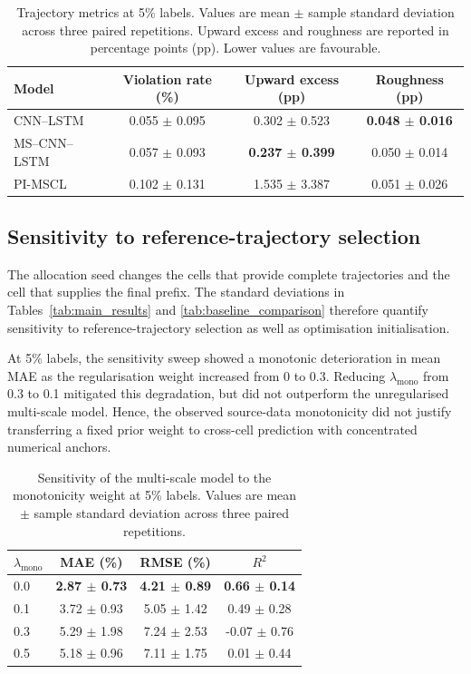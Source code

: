 \documentclass[pdflatex,sn-mathphys-num]{sn-jnl}
\begin{document}
\begin{table}[t]
\caption{Trajectory metrics at 5\% labels. Values are mean $\pm$ sample standard deviation across three paired repetitions. Upward excess and roughness are reported in percentage points (pp). Lower values are favourable.}
\label{tab:trajectory_metrics}
\centering
\small
\begin{tabular*}{\textwidth}{@{\extracolsep{\fill}}lccc@{}}
\toprule
Model & Violation rate (\%) & Upward excess (pp) & Roughness (pp) \\
\midrule
CNN--LSTM & 0.055 $\pm$ 0.095 & 0.302 $\pm$ 0.523 & \textbf{0.048 $\pm$ 0.016} \\
MS--CNN--LSTM & 0.057 $\pm$ 0.093 & \textbf{0.237 $\pm$ 0.399} & 0.050 $\pm$ 0.014 \\
PI-MSCL & 0.102 $\pm$ 0.131 & 1.535 $\pm$ 3.387 & 0.051 $\pm$ 0.026 \\
\bottomrule
\end{tabular*}
\end{table}

\subsection{Sensitivity to reference-trajectory selection}
\label{subsec:sensitivity}

The allocation seed changes the cells that provide complete trajectories and the cell that supplies the final prefix. The standard deviations in Tables~\ref{tab:main_results} and \ref{tab:baseline_comparison} therefore quantify sensitivity to reference-trajectory selection as well as optimisation initialisation.

At 5\% labels, the sensitivity sweep showed a monotonic deterioration in mean MAE as the regularisation weight increased from 0 to 0.3. Reducing $\lambda_{\mathrm{mono}}$ from 0.3 to 0.1 mitigated this degradation, but did not outperform the unregularised multi-scale model. Hence, the observed source-data monotonicity did not justify transferring a fixed prior weight to cross-cell prediction with concentrated numerical anchors.

\begin{table}[t]
\caption{Sensitivity of the multi-scale model to the monotonicity weight at 5\% labels. Values are mean $\pm$ sample standard deviation across three paired repetitions.}
\label{tab:lambda_sensitivity}
\centering
\small
\begin{tabular*}{\textwidth}{@{\extracolsep{\fill}}lccc@{}}
\toprule
$\lambda_{\mathrm{mono}}$ & MAE (\%) & RMSE (\%) & $R^2$ \\
\midrule
0.0 & \textbf{2.87 $\pm$ 0.73} & \textbf{4.21 $\pm$ 0.89} & \textbf{0.66 $\pm$ 0.14} \\
0.1 & 3.72 $\pm$ 0.93 & 5.05 $\pm$ 1.42 & 0.49 $\pm$ 0.28 \\
0.3 & 5.29 $\pm$ 1.98 & 7.24 $\pm$ 2.53 & -0.07 $\pm$ 0.76 \\
0.5 & 5.18 $\pm$ 0.96 & 7.11 $\pm$ 1.75 & 0.01 $\pm$ 0.44 \\
\bottomrule
\end{tabular*}
\end{table}
\end{document}
